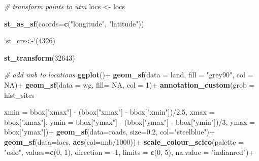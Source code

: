 \documentclass[]{article}
\newenvironment{Shaded}{}{}
\newcommand{\CommentTok}[1]{\textcolor[rgb]{0.38,0.63,0.69}{\textit{#1}}}
\newcommand{\DataTypeTok}[1]{\textcolor[rgb]{0.56,0.13,0.00}{#1}}
\newcommand{\DecValTok}[1]{\textcolor[rgb]{0.25,0.63,0.44}{#1}}
\newcommand{\FloatTok}[1]{\textcolor[rgb]{0.25,0.63,0.44}{#1}}
\newcommand{\KeywordTok}[1]{\textcolor[rgb]{0.00,0.44,0.13}{\textbf{#1}}}
\newcommand{\NormalTok}[1]{#1}
\newcommand{\OperatorTok}[1]{\textcolor[rgb]{0.40,0.40,0.40}{#1}}
\newcommand{\OtherTok}[1]{\textcolor[rgb]{0.00,0.44,0.13}{#1}}
\newcommand{\StringTok}[1]{\textcolor[rgb]{0.25,0.44,0.63}{#1}}
\begin{document}
\begin{Shaded}
\begin{Highlighting}[]
\CommentTok{# transform points to utm}
\NormalTok{locs <-}\StringTok{ }\NormalTok{locs }\OperatorTok{%
\StringTok{  }\KeywordTok{st_as_sf}\NormalTok{(}\DataTypeTok{coords=}\KeywordTok{c}\NormalTok{(}\StringTok{"longitude"}\NormalTok{, }\StringTok{"latitude"}\NormalTok{)) }\OperatorTok{%
\StringTok{  `}\DataTypeTok{st_crs<-}\StringTok{`}\NormalTok{(}\DecValTok{4326}\NormalTok{) }\OperatorTok{%
\StringTok{  }\KeywordTok{st_transform}\NormalTok{(}\DecValTok{32643}\NormalTok{)}

\CommentTok{# add nnb to locations}
\KeywordTok{ggplot}\NormalTok{()}\OperatorTok{+}
\StringTok{  }\KeywordTok{geom_sf}\NormalTok{(}\DataTypeTok{data =}\NormalTok{ land, }\DataTypeTok{fill =} \StringTok{"grey90"}\NormalTok{, }\DataTypeTok{col =} \OtherTok{NA}\NormalTok{)}\OperatorTok{+}
\StringTok{  }\KeywordTok{geom_sf}\NormalTok{(}\DataTypeTok{data =}\NormalTok{ wg, }\DataTypeTok{fill=} \OtherTok{NA}\NormalTok{, }\DataTypeTok{col =} \DecValTok{1}\NormalTok{)}\OperatorTok{+}
\StringTok{  }\KeywordTok{annotation_custom}\NormalTok{(}\DataTypeTok{grob =}\NormalTok{ hist_sites }\OperatorTok{%
                    \DataTypeTok{xmin =}\NormalTok{ bbox[}\StringTok{"xmax"}\NormalTok{] }\OperatorTok{-}\StringTok{ }\NormalTok{(bbox[}\StringTok{"xmax"}\NormalTok{] }\OperatorTok{-}\StringTok{ }\NormalTok{bbox[}\StringTok{"xmin"}\NormalTok{])}\OperatorTok{/}\FloatTok{2.5}\NormalTok{, }
                    \DataTypeTok{xmax =}\NormalTok{ bbox[}\StringTok{"xmax"}\NormalTok{], }
                    \DataTypeTok{ymin =}\NormalTok{ bbox[}\StringTok{"ymax"}\NormalTok{] }\OperatorTok{-}\StringTok{ }\NormalTok{(bbox[}\StringTok{"ymax"}\NormalTok{] }\OperatorTok{-}\StringTok{ }\NormalTok{bbox[}\StringTok{"ymin"}\NormalTok{])}\OperatorTok{/}\DecValTok{3}\NormalTok{, }
                    \DataTypeTok{ymax =}\NormalTok{ bbox[}\StringTok{"ymax"}\NormalTok{])}\OperatorTok{+}
\StringTok{  }\KeywordTok{geom_sf}\NormalTok{(}\DataTypeTok{data=}\NormalTok{roads, }\DataTypeTok{size=}\FloatTok{0.2}\NormalTok{, }\DataTypeTok{col=}\StringTok{"steelblue"}\NormalTok{)}\OperatorTok{+}
\StringTok{  }\KeywordTok{geom_sf}\NormalTok{(}\DataTypeTok{data=}\NormalTok{locs, }\KeywordTok{aes}\NormalTok{(}\DataTypeTok{col=}\NormalTok{nnb}\OperatorTok{/}\DecValTok{1000}\NormalTok{))}\OperatorTok{+}
\StringTok{  }
\StringTok{  }\KeywordTok{scale_colour_scico}\NormalTok{(}\DataTypeTok{palette =} \StringTok{"oslo"}\NormalTok{, }\DataTypeTok{values=}\KeywordTok{c}\NormalTok{(}\DecValTok{0}\NormalTok{, }\DecValTok{1}\NormalTok{), }\DataTypeTok{direction =} \DecValTok{-1}\NormalTok{, }\DataTypeTok{limits =} \KeywordTok{c}\NormalTok{(}\DecValTok{0}\NormalTok{, }\DecValTok{5}\NormalTok{),}
                     \DataTypeTok{na.value =} \StringTok{"indianred"}\NormalTok{)}\OperatorTok{+}

}}}}
\end{Highlighting}
\end{Shaded}
\end{document}
